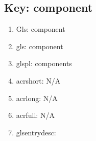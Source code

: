 \subsection{Key: component}
\begin{enumerate}
  \item Gls:                   \Gls{component}
  \item gls:                   \gls{component}
  \item glspl:               \glspl{component}
  \item acrshort: N/A
  \item acrlong:  N/A
  \item acrfull:  N/A
  \item glsentrydesc: 
\end{enumerate}
